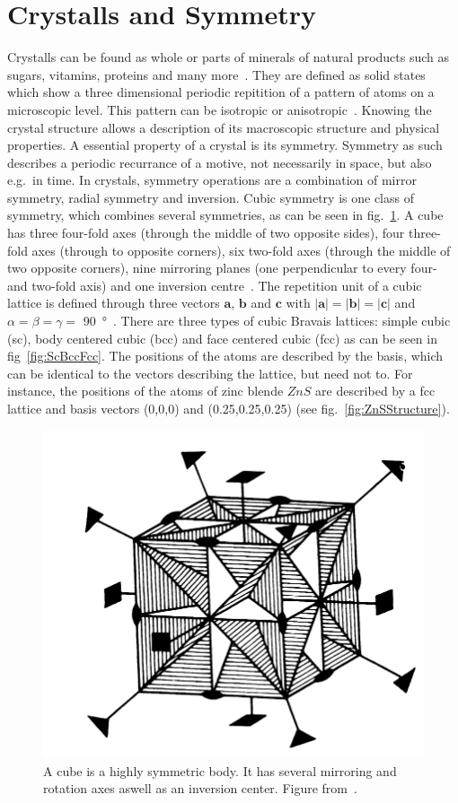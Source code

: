  
\section{Crystalls and Symmetry}\label{sec:Q4}

Crystalls can be found as whole or parts of minerals of natural products such as sugars, vitamins, proteins and many more~\cite{Bohm.2021}. They are defined as solid states which show a three dimensional periodic repitition of a pattern of atoms on a microscopic level. This pattern can be isotropic or anisotropic~\cite{Schwarzenbach.2001}. Knowing the crystal structure allows a description of its macroscopic structure and physical properties. A essential property of a crystal is its symmetry. Symmetry as such describes a periodic recurrance of a motive, not necessarily in space, but also e.g.~in time. In crystals, symmetry operations are a combination of mirror symmetry, radial symmetry and inversion. Cubic symmetry is one class of symmetry, which combines several symmetries, as can be seen in fig.~\ref{fig:CubeSymm}. A cube has three four-fold axes (through the middle of two opposite sides), four three-fold axes (through to opposite corners), six two-fold axes (through the middle of two opposite corners), nine mirroring planes (one perpendicular to every four- and two-fold axis) and one inversion centre~\cite{Bohm.2021}. The repetition unit of a cubic lattice is defined through three vectors $\mathbf{a}$, $\mathbf{b}$ and $\mathbf{c}$ with $|\mathbf{a}|=|\mathbf{b}|=|\mathbf{c}|$ and $\alpha = \beta = \gamma =$ \SI{90}{\degree}~\cite{Schwarzenbach.2001}. There are three types of cubic Bravais lattices: simple cubic (sc), body centered cubic (bcc) and face centered cubic (fcc) as can be seen in fig~\ref{fig:ScBccFcc}. The positions of the atoms are described by the basis, which can be identical to the vectors describing the lattice, but need not to. For instance, the positions of the atoms of zinc blende $ZnS$ are described by a fcc lattice and basis vectors (0,0,0) and (0.25,0.25,0.25) (see fig.~\ref{fig:ZnSStructure}).

\begin{figure}[ht]
    \centering
    \includegraphics[width = 0.45\linewidth]{Bilder/Grundlagen/cube symmeries.png}
    \caption{A cube is a highly symmetric body. It has several mirroring and rotation axes aswell as an inversion center. Figure from~\cite{Bohm.2021}.}
    \label{fig:CubeSymm}
\end{figure}

